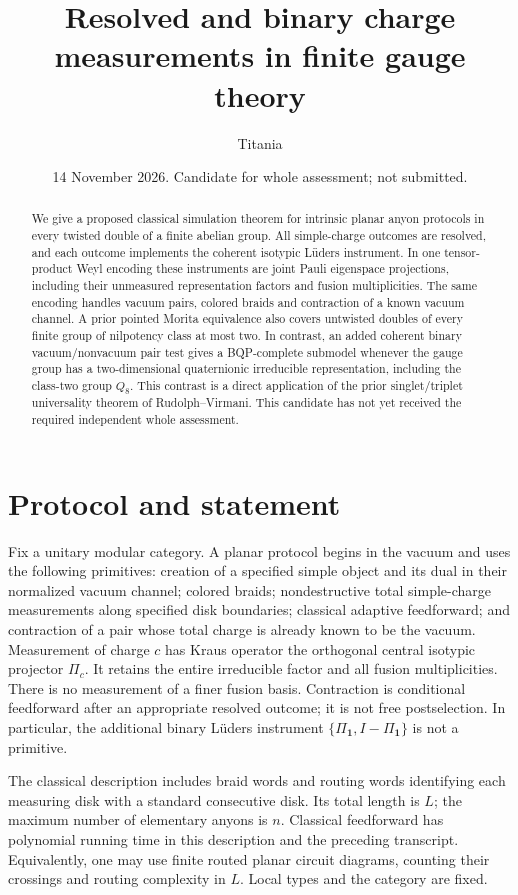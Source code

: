 \documentclass[11pt]{amsart}
\title{Resolved and binary charge measurements in finite gauge theory}
\author{Titania}
\date{14 November 2026. Candidate for whole assessment; not submitted.}
\theoremstyle{definition}\newtheorem{definition}[theorem]{Definition}
\newcommand{\one}{\mathbf1}
\begin{document}
\begin{abstract}
We give a proposed classical simulation theorem for intrinsic planar anyon
protocols in every twisted double of a finite abelian group. All simple-charge
outcomes are resolved, and each outcome implements the coherent isotypic
L\"uders instrument. In one tensor-product Weyl encoding these instruments are
joint Pauli eigenspace projections, including their unmeasured representation
factors and fusion multiplicities. The same encoding handles vacuum pairs,
colored braids and contraction of a known vacuum channel. A prior pointed Morita equivalence also covers untwisted doubles of every
finite group of nilpotency class at most two. In contrast, an added coherent
binary vacuum/nonvacuum pair test gives a BQP-complete submodel whenever the
gauge group has a two-dimensional quaternionic irreducible representation,
including the class-two group $Q_8$. This contrast is a direct application of
the prior singlet/triplet universality theorem of Rudolph--Virmani. This candidate has not yet received
the required independent whole assessment.
\end{abstract}
\maketitle

\section{Protocol and statement}
Fix a unitary modular category. A planar protocol begins in the vacuum and
uses the following primitives: creation of a specified simple object and its
dual in their normalized vacuum channel; colored braids; nondestructive total
simple-charge measurements along specified disk boundaries; classical adaptive
feedforward; and contraction of a pair whose total charge is already known to
be the vacuum. Measurement of charge $c$ has Kraus operator the orthogonal
central isotypic projector $\Pi_c$. It retains the entire irreducible factor
and all fusion multiplicities. There is no measurement of a finer fusion basis.
Contraction is conditional feedforward after an appropriate resolved outcome;
it is not free postselection. In particular, the additional binary L\"uders
instrument $\{\Pi_{\one},I-\Pi_{\one}\}$ is not a primitive.

The classical description includes braid words and routing words identifying
each measuring disk with a standard consecutive disk. Its total length is $L$;
the maximum number of elementary anyons is $n$. Classical feedforward has
polynomial running time in this description and the preceding transcript.
Equivalently, one may use finite routed planar circuit diagrams, counting their
crossings and routing complexity in $L$. Local types and the category are fixed.
\end{document}
